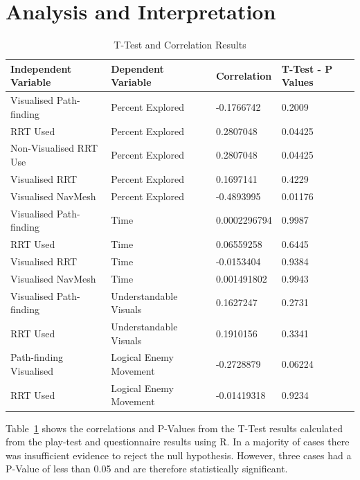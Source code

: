 \documentclass[journal]{IEEEtran}
\begin{document}
	\section{Analysis and Interpretation} \label{Analysis}
	\begin{table}[]
		\centering
		\caption{T-Test and Correlation Results}
		\label{StatsTable}
		\def\arraystretch{1.5}
		\begin{tabular}{|l|l|l|l|}
			\hline
			\textbf{Independent Variable }    &  \textbf{Dependent Variable } & \textbf{Correlation} & \textbf{T-Test - P Values}                   \\ \hline
			Visualised Path-finding & Percent Explored       & -0.1766742   & 0.2009            \\ \hline
			RRT Used               & Percent Explored        & 0.2807048    & 0.04425          \\ \hline
			Non-Visualised RRT Use & Percent Explored       & 0.2807048    & 0.04425           \\ \hline
			Visualised RRT         & Percent Explored       & 0.1697141    & 0.4229            \\ \hline
			Visualised NavMesh     & Percent Explored       & -0.4893995   & 0.01176           \\ \hline
			Visualised Path-finding & Time                   & 0.0002296794 & 0.9987            \\ \hline
			RRT Used               & Time                   & 0.06559258   & 0.6445            \\ \hline
			Visualised RRT         & Time                   & -0.0153404   & 0.9384            \\ \hline
			Visualised NavMesh     & Time                   & 0.001491802  & 0.9943            \\ \hline
			Visualised Path-finding & Understandable Visuals & 0.1627247    & 0.2731            \\ \hline
			RRT Used               & Understandable Visuals & 0.1910156    & 0.3341            \\ \hline
			Path-finding Visualised & Logical Enemy Movement & -0.2728879   & 0.06224           \\ \hline
			RRT Used               & Logical Enemy Movement & -0.01419318  & 0.9234            \\ \hline
		\end{tabular}
	\end{table}
	
	
	Table~\ref{StatsTable} shows the correlations and P-Values from the T-Test results calculated from the play-test and questionnaire results using R. In a majority of cases there was insufficient evidence to reject the null hypothesis. However, three cases had a P-Value of less than 0.05 and are therefore statistically significant. 
	
\end{document}
